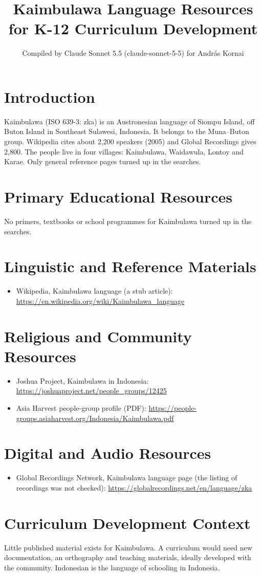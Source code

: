 \documentclass[12pt]{article}
\title{Kaimbulawa Language Resources for K-12 Curriculum Development}
\author{Compiled by Claude Sonnet 5.5 (claude-sonnet-5-5) for Andr\'as Kornai}
\date{}
\begin{document}
\maketitle

\section{Introduction}
Kaimbulawa (ISO 639-3: zka) is an Austronesian language of Siompu Island, off Buton Island in Southeast Sulawesi, Indonesia. It belongs to the Muna--Buton group. Wikipedia cites about 2,200 speakers (2005) and Global Recordings gives 2,800. The people live in four villages: Kaimbulawa, Waidawula, Lontoy and Karae. Only general reference pages turned up in the searches.

\section{Primary Educational Resources}
No primers, textbooks or school programmes for Kaimbulawa turned up in the searches.

\section{Linguistic and Reference Materials}
\begin{itemize}
\item Wikipedia, Kaimbulawa language (a stub article): \url{https://en.wikipedia.org/wiki/Kaimbulawa_language}
\end{itemize}

\section{Religious and Community Resources}
\begin{itemize}
\item Joshua Project, Kaimbulawa in Indonesia: \url{https://joshuaproject.net/people_groups/12425}
\item Asia Harvest people-group profile (PDF): \url{https://people-groups.asiaharvest.org/Indonesia/Kaimbulawa.pdf}
\end{itemize}

\section{Digital and Audio Resources}
\begin{itemize}
\item Global Recordings Network, Kaimbulawa language page (the listing of recordings was not checked): \url{https://globalrecordings.net/en/language/zka}
\end{itemize}

\section{Curriculum Development Context}
Little published material exists for Kaimbulawa. A curriculum would need new documentation, an orthography and teaching materials, ideally developed with the community. Indonesian is the language of schooling in Indonesia.
\end{document}
